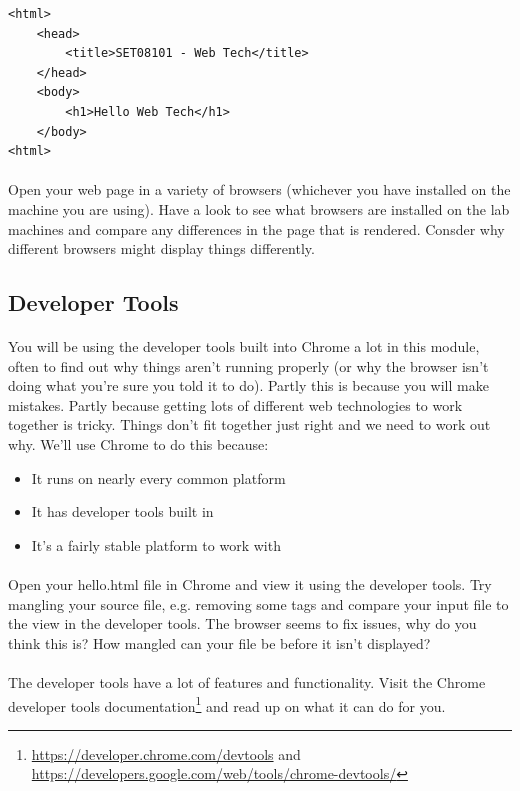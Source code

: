 \documentclass[10pt, a4paper, twosize]{article}
\begin{document}
\begin{lstlisting}
<html>
    <head>
        <title>SET08101 - Web Tech</title>
    </head>
    <body>
        <h1>Hello Web Tech</h1>
    </body>
<html>
\end{lstlisting}

\paragraph{} Open your web page in a variety of browsers (whichever you have installed on the machine you are using). Have a look to see what browsers are installed on the lab machines and compare any differences in the page that is rendered. Consder why different browsers might display things differently.

\subsection{Developer Tools}
\paragraph{} You will be using the developer tools built into Chrome a lot in this module, often to find out why things aren't running properly (or why the browser isn't doing what you're sure you told it to do). Partly this is because you will make mistakes. Partly because getting lots of different web technologies to work together is tricky. Things don't fit together just right and we need to work out why. We'll use Chrome to do this because:

\begin{itemize}
\item It runs on nearly every common platform
\item It has developer tools built in
\item It's a fairly stable platform to work with
\end{itemize}

\paragraph{} Open your hello.html file in Chrome and view it using the developer tools. Try mangling your source file, e.g. removing some tags and compare your input file to the view in the developer tools. The browser seems to fix issues, why do you think this is? How mangled can your file be before it isn't displayed? 

\paragraph{} The developer tools have a lot of features and functionality. Visit the Chrome developer tools documentation\footnote{\url{https://developer.chrome.com/devtools} and \url{https://developers.google.com/web/tools/chrome-devtools/}} and read up on what it can do for you.
\end{document}
